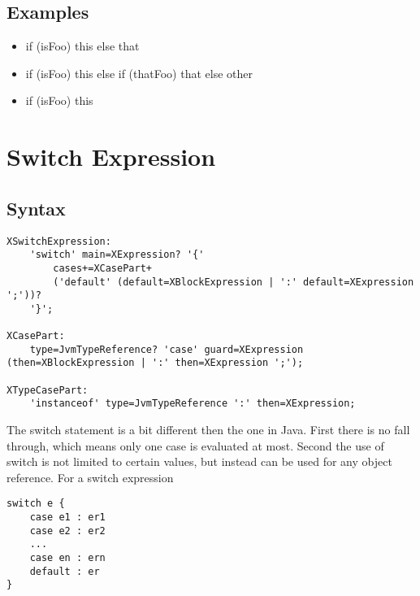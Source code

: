 \documentclass[a4paper,10pt]{scrreprt}
\newlength{\itemindentlen}
\begin{document}
\subsection{Examples}


\setlength{\itemindentlen}{\textwidth}
\begin{itemize}
\addtolength{\itemindentlen}{-2em}

\item \begin{minipage}[t]{\itemindentlen}
if (isFoo) this else that
\end{minipage}

\item \begin{minipage}[t]{\itemindentlen}
if (isFoo) this else if (thatFoo) that else other
\end{minipage}

\item \begin{minipage}[t]{\itemindentlen}
if (isFoo) this
\end{minipage}

\end{itemize}
\addtolength{\itemindentlen}{2em}







\section{Switch Expression}
\label{SwitchExpression}


\subsection{Syntax}

\begin{lstlisting}
XSwitchExpression:
	'switch' main=XExpression? '{'
		cases+=XCasePart+
		('default' (default=XBlockExpression | ':' default=XExpression ';'))?
	'}';

XCasePart:
	type=JvmTypeReference? 'case' guard=XExpression (then=XBlockExpression | ':' then=XExpression ';');	

XTypeCasePart:
	'instanceof' type=JvmTypeReference ':' then=XExpression;	

\end{lstlisting}


The switch statement is a bit different then the one in Java. First there is no fall through, which means only one case is evaluated at most.
Second the use of switch is not limited to certain values, but instead can be used for any object reference. 
For a switch expression 
\begin{lstlisting}
switch e {
	case e1 : er1
	case e2 : er2
	...
	case en : ern
	default : er
}

\end{lstlisting}
\end{document}
